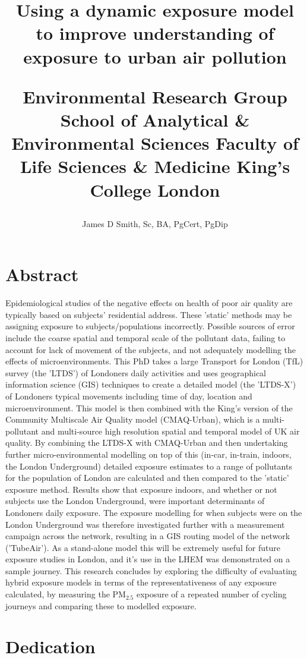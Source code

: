 \documentclass[12pt]{report}
\title{
	{Using a dynamic exposure model to improve understanding of exposure to urban air pollution}
	\author{James D Smith, Sc, BA, PgCert, PgDip}
	\vspace{3cm}
	{\large Environmental Research Group}
	{\large School of Analytical \& Environmental Sciences}
	{\large Faculty of Life Sciences \& Medicine}
	{\large King's College London}
	}
\begin{document}
\maketitle
\chapter*{Abstract}
Epidemiological studies of the negative effects on health of poor air quality are typically based on subjects' residential address. These 'static' methods may be assigning exposure to subjects/populations incorrectly. Possible sources of error include the coarse spatial and temporal scale of the pollutant data, failing to account for lack of movement of the subjects, and not adequately modelling the effects of microenvironments. This PhD takes a large Transport for London (TfL) survey (the 'LTDS') of Londoners daily activities and uses geographical information science (GIS) techniques to create a detailed model (the 'LTDS-X') of Londoners typical movements including time of day, location and microenvironment. This model is then combined with the King’s version of the Community Multiscale Air Quality model (CMAQ-Urban), which is a multi-pollutant and multi-source high resolution spatial and temporal model of UK air quality. By combining the LTDS-X with CMAQ-Urban and then undertaking further micro-environmental modelling on top of this (in-car, in-train, indoors, the London Underground) detailed exposure estimates to a range of pollutants for the population of London are calculated and then compared to the 'static' exposure method. Results show that exposure indoors, and whether or not subjects use the London Underground, were important determinants of Londoners daily exposure. The exposure modelling for when subjects were on the London Underground was therefore investigated further with a measurement campaign across the network, resulting in a GIS routing model of the network ('TubeAir'). As a stand-alone model this will be extremely useful for future exposure studies in London, and it’s use in the LHEM was demonstrated on a sample journey. This research concludes by exploring the difficulty of evaluating hybrid exposure models in terms of the representativeness of any exposure calculated, by measuring the PM$_{2.5}$ exposure of a repeated number of cycling journeys and comparing these to modelled exposure.

\chapter*{Dedication}
\end{document}
